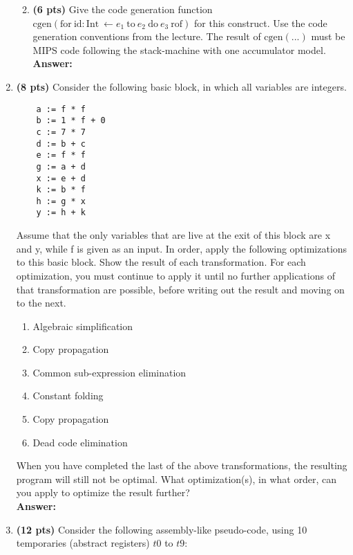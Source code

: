 \documentclass[11pt]{article}
\begin{document}
\begin{enumerate}
\begin{enumerate}
   \newpage
    \item \textbf{(6 pts)} Give the code generation function $\mbox{cgen}(\mbox{for}\ \mbox{id}: \mbox{Int}\ \leftarrow e_1\ \mbox{to}\ e_2\ \mbox{do}\ e_3\ \mbox{rof})$ for this construct. Use the code generation conventions from the lecture. The result of $\mbox{cgen}(...)$ must be MIPS code following the stack-machine with one accumulator model.\\
    \textbf{Answer:} 
    
   \newpage
  \end{enumerate}
  
  \item \textbf{(8 pts)} Consider the following basic block, in which all variables are integers.
  
  \begin{lstlisting}
    a := f * f
    b := 1 * f + 0
    c := 7 * 7
    d := b + c
    e := f * f
    g := a + d
    x := e + d
    k := b * f
    h := g * x
    y := h + k
  \end{lstlisting}
  
  Assume that the only variables that are live at the exit of this block are x and y, while f is given as an input. In order, apply the following optimizations to this basic block. Show the result of each transformation. For each optimization, you must continue to apply it until no further applications of that transformation are possible, before writing out the result and moving on to the next.
  
  \begin{enumerate}
    \item Algebraic simplification
    \item Copy propagation
    \item Common sub-expression elimination
    \item Constant folding
    \item Copy propagation
    \item Dead code elimination
  \end{enumerate}
  
  When you have completed the last of the above transformations, the resulting program will still not be optimal. What optimization(s), in what order, can you apply to optimize the result further?\\
    \textbf{Answer:} 
    
   \newpage
  
  
  \item \textbf{(12 pts)} Consider the following assembly-like pseudo-code, using 10 temporaries (abstract registers) $t0$ to $t9$: \\
  

\end{enumerate}
\end{document}
